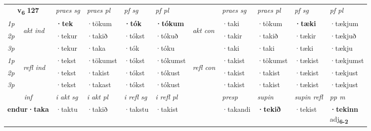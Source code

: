 \noindent
\begin{tabular}{lllllllllll} \toprule
\multicolumn{2}{c}{\textbf{v{\textsubscript{6}}} \Large{\textbf{127}}}  &  \textit{praes sg}  & \textit{praes pl}  &\textit{ pf sg} & \textit{pf pl} &  &  \textit{praes sg}  & \textit{praes pl}  & \textit{pf sg} & \textit{pf pl } \\*
	\cmidrule{3-6} \cmidrule{8-11}
 {\textit{1p}} & \multirow{3}{*}{\begin{turn}{90}\textit{akt ind}\end{turn}} & \textbf{·tek} & ·tökum & \textbf{·tók} & \textbf{·tókum} & \multirow{3}{*}{\begin{turn}{90}\textit{akt con}\end{turn}} &·taki & ·tökum & \textbf{·tæki} & ·tækjum\\*
 {\textit{2p}} &  &  ·tekur  & ·takið & ·tókst & ·tókuð & & ·takir & ·takið & ·tækir & ·tækjuð \\*
{\textit{3p}} &  & ·tekur & ·taka & ·tók & ·tóku & & ·taki & ·taki& ·tæki & ·tækju \\*
\cmidrule{3-6} \cmidrule{8-11}
 {\textit{1p}} & \multirow{3}{*}{\begin{turn}{90}\textit{refl ind}\end{turn}}  & ·tekst & ·tökumst & ·tókst & ·tókumst & \multirow{3}{*}{\begin{turn}{90}\textit{refl con}\end{turn}}  &·takist & ·tökumst & ·tækist & ·tækjumst \\*
 {\textit{2p}} &  & ·tekst & ·takist & ·tókst & ·tókust & &·takist & ·takist & ·tækist & ·tækjust \\*
 {\textit{3p}}  & & ·tekst & ·takast & ·tókst & ·tókust & & ·takist & ·takist& ·tækist & ·tækjust \\*
\cmidrule{3-6} \cmidrule{8-11}

   \multicolumn{2}{c}{\textit{inf}}  & \textit{i akt sg} & \textit{i akt pl} & \textit{i refl sg} & \textit{i refl pl} && \textit{presp} & \textit{supin} & \textit{supin refl} & \textit{pp m} \\*
  \multicolumn{2}{c}{\textbf{endur\allowbreak ·taka}} & ·taktu  & ·takið & ·takstu & ·takist && ·takandi &  \textbf{·tekið} & ·tekist & \specialcell{\textbf{·tekinn} \\ adj\textbf{\textsubscript{6-2}}} \\*
\end{tabular}

